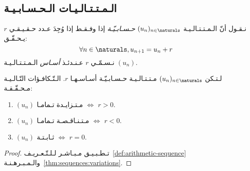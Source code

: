 \subsection{الـمـتـتـالـيـات الـحـسـابـيـة}%
\label{subsec:sequences:special:arithmetic}

\begin{definition}%
    \label{def:arithmetic-sequence}
    نـقـول أنّ الـمـتـتـالـيـة \((u_n)_{n \in \naturals}\) \emph{حـسـابـيّـة}
    إذا وفـقـط إذا وُجِدَ عـدد حـقـيـقـي \(r\) يـحـقّـق:
    \[\forall n \in \naturals, u_{n+1} = u_n + r\]
    نـسـمّـي \(r\) عـنـدئـذ \emph{أسـاس} الـمـتـتـالـيـة \((u_n)\).
\end{definition}

\begin{proposition}%
    \label{prop:arithmetic-sequence:variation}
    لـتـكن \((u_n)_{n \in \naturals}\) مـتـتـالـيـة حـسـابـيّـة أسـاسـهـا \(r\).
    الـتّـكافـؤات التّـالـيـة مـحـقّـقـة:
    \begin{enumerate}
        \item \((u_n)\) مـتـزايـدة تـمامـا \(\iff\) \(r > 0\).
        \item \((u_n)\) مـتـنـاقـصـة تـمامـا \(\iff\) \(r < 0\).
        \item \((u_n)\) ثـابـتـة \(\iff\) \(r = 0\).
    \end{enumerate}
\end{proposition}
\begin{proof}
    تـطـبـيـق مـبـاشـر لـلـتّـعـريـف~\ref{def:arithmetic-sequence}
    والـمـبـرهـنـة~\ref{thm:sequences:variations}.
\end{proof}
